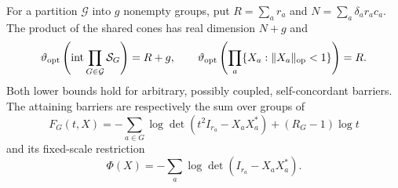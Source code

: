 \begin{theorem}\label{thm:shared-spectral-parameter}
For a partition $\mathcal G$ into $g$ nonempty groups, put
$R=\sum_a r_a$ and $N=\sum_a\delta_a r_ac_a$.
The product of the shared cones has real dimension $N+g$ and
\begin{equation}\label{eq:spectral-exact-ledger}
 \vartheta_{\rm opt}\left(\operatorname{int}\prod_{G\in\mathcal G}\mathcal S_G\right)
       =R+g,\qquad
 \vartheta_{\rm opt}\left(\prod_a\{X_a:\lVert X_a\rVert_{\rm op}<1\}\right)
       =R.
\end{equation}
Both lower bounds hold for arbitrary, possibly coupled, self-concordant
barriers.
The attaining barriers are respectively the sum over groups of
\begin{equation}\label{eq:shared-spectral-barrier}
 F_G(t,X)=-\sum_{a\in G}\log\det(t^2I_{r_a}-X_aX_a^*)
                  +(R_G-1)\log t
\end{equation}
and its fixed-scale restriction
\begin{equation}\label{eq:spectral-slice-barrier}
 \Phi(X)=-\sum_a\log\det(I_{r_a}-X_aX_a^*).
\end{equation}
\end{theorem}
